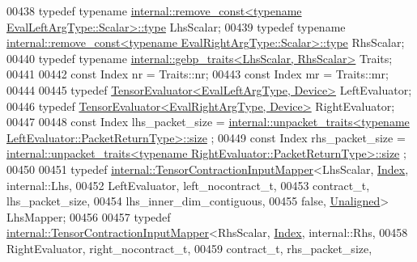\begin{DoxyCode}
00438     \textcolor{keyword}{typedef} \textcolor{keyword}{typename} 
      \hyperlink{group___sparse_core___module}{internal::remove\_const<typename EvalLeftArgType::Scalar>::type}
       LhsScalar;
00439     \textcolor{keyword}{typedef} \textcolor{keyword}{typename} 
      \hyperlink{group___sparse_core___module}{internal::remove\_const<typename EvalRightArgType::Scalar>::type}
       RhsScalar;
00440     \textcolor{keyword}{typedef} \textcolor{keyword}{typename} \hyperlink{class_eigen_1_1internal_1_1gebp__traits}{internal::gebp\_traits<LhsScalar, RhsScalar>}
       Traits;
00441 
00442     \textcolor{keyword}{const} Index nr = Traits::nr;
00443     \textcolor{keyword}{const} Index mr = Traits::mr;
00444 
00445     \textcolor{keyword}{typedef} \hyperlink{struct_eigen_1_1_tensor_evaluator}{TensorEvaluator<EvalLeftArgType, Device>} LeftEvaluator;
00446     \textcolor{keyword}{typedef} \hyperlink{struct_eigen_1_1_tensor_evaluator}{TensorEvaluator<EvalRightArgType, Device>} 
      RightEvaluator;
00447 
00448     \textcolor{keyword}{const} Index lhs\_packet\_size = 
      \hyperlink{struct_eigen_1_1internal_1_1unpacket__traits}{internal::unpacket\_traits<typename LeftEvaluator::PacketReturnType>::size}
      ;
00449     \textcolor{keyword}{const} Index rhs\_packet\_size = 
      \hyperlink{struct_eigen_1_1internal_1_1unpacket__traits}{internal::unpacket\_traits<typename RightEvaluator::PacketReturnType>::size}
      ;
00450 
00451     \textcolor{keyword}{typedef} \hyperlink{class_eigen_1_1internal_1_1_tensor_contraction_input_mapper}{internal::TensorContractionInputMapper}<LhsScalar, 
      \hyperlink{namespace_eigen_a62e77e0933482dafde8fe197d9a2cfde}{Index}, internal::Lhs,
00452                                                    LeftEvaluator, left\_nocontract\_t,
00453                                                    contract\_t, lhs\_packet\_size,
00454                                                    lhs\_inner\_dim\_contiguous,
00455                                                    \textcolor{keyword}{false}, \hyperlink{group__enums_gga45fe06e29902b7a2773de05ba27b47a1ac935220b4c844108e183ebe30a4d5204}{Unaligned}> LhsMapper;
00456 
00457     \textcolor{keyword}{typedef} \hyperlink{class_eigen_1_1internal_1_1_tensor_contraction_input_mapper}{internal::TensorContractionInputMapper}<RhsScalar, 
      \hyperlink{namespace_eigen_a62e77e0933482dafde8fe197d9a2cfde}{Index}, internal::Rhs,
00458                                                    RightEvaluator, right\_nocontract\_t,
00459                                                    contract\_t, rhs\_packet\_size,

\end{DoxyCode}
